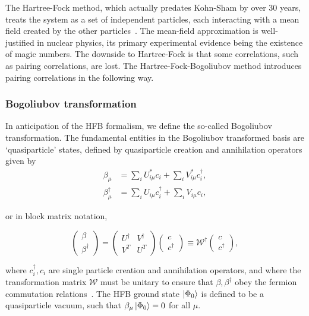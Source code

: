 The Hartree-Fock method, which actually predates Kohn-Sham by over 30 years, treats the system as a set of independent particles, each interacting with a mean field created by the other particles~\cite{Ring1980}. The mean-field approximation is well-justified in nuclear physics, its primary experimental evidence being the existence of magic numbers. The downside to Hartree-Fock is that some correlations, such as pairing correlations, are lost. The Hartree-Fock-Bogoliubov method introduces pairing correlations in the following way.

\subsubsection{Bogoliubov transformation}

In anticipation of the HFB formalism, we define the so-called Bogoliubov transformation. The fundamental entities in the Bogoliubov transformed basis are `quasiparticle' states, defined by quasiparticle creation and annihilation operators given by
\begin{align}
\beta_\mu &= \sum_i U^*_{i\mu}c_i + \sum_i V^*_{i\mu}c_i^\dagger, \\
\beta_\mu^\dagger &= \sum_i U_{i\mu}c_i^\dagger + \sum_i V_{i\mu}c_i,
\end{align}

\noindent or in block matrix notation,

\begin{equation}
\left(\begin{array}{c} \beta \\ \beta^\dagger\end{array}\right) = 
\left(\begin{array}{cc} U^\dagger & V^\dagger \\ V^T & U^T \end{array}\right)
\left(\begin{array}{c} c \\ c^\dagger\end{array}\right)
\equiv \mathcal{W}^\dagger \left(\begin{array}{c} c \\ c^\dagger\end{array}\right),
\end{equation}

\noindent where $c_i^\dagger, c_i$ are single particle creation and annihilation operators, and where the transformation matrix $\mathcal{W}$ must be unitary to ensure that $\beta, \beta^\dagger$ obey the fermion commutation relations~\cite{Ring1980}. The HFB ground state $\ket{\Phi_0}$ is defined to be a quasiparticle vacuum, such that $\beta_\mu\ket{\Phi_0}=0$ for all $\mu$.

